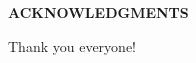\begin{center}
\vspace*{52pt}
{\normalfont \textbf{ACKNOWLEDGMENTS}}
\end{center}

Thank you everyone!


\clearpage
